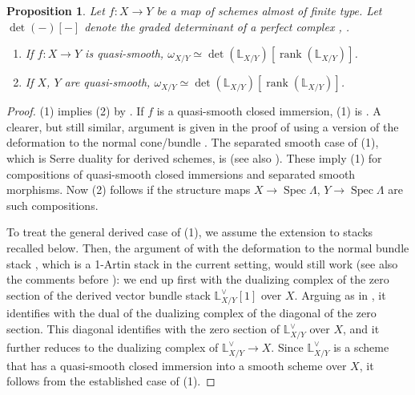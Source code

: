 \documentclass{amsart}
\newtheorem{proposition}[theorem]{Proposition}
\theoremstyle{definition}
\theoremstyle{remark}
\numberwithin{equation}{section}
\DeclareMathOperator{\Spec}{Spec}
\DeclareMathOperator{\rank}{rank}
\newcommand{\bb}{\mathbb}
\begin{document}
\begin{proposition}\label{prop: QuasismoothDualizingScheme}
Let $f\colon X\to Y$ be a map of schemes almost of finite type. Let $\det(-)[-]$ denote the graded determinant of a perfect complex \cite{Heleodoro}, \cite[Appendix B]{HalpernLeistner}.  
\begin{enumerate}
    \item If $f\colon X\to Y$ is quasi-smooth, $\omega_{X/Y}\simeq \det (\bb L_{X/Y})[\rank(\bb L_{X/Y})]$. 
    \item If $X$, $Y$ are quasi-smooth, $\omega_{X/Y} \simeq \det (\bb L_{X/Y})[\rank(\bb L_{X/Y})]$.  
\end{enumerate}
\end{proposition}

\begin{proof}
(1) implies (2) by \cite[(46), (48)]{HalpernLeistner}. If $f$ is a quasi-smooth closed immersion, (1) is \cite[Corollary 9.7.3.2]{GRII}. A clearer, but still similar, argument is given in the proof of \cite[Lemma 2.4.5]{HalpernLeistner} using a version of the deformation to the normal cone/bundle \cite{KhanRydh}. The separated smooth case of (1), which is Serre duality for derived schemes, is \cite[Proposition 9.7.3.4]{GRII} (see also \cite[Lecture VIII, Option 1]{ScholzeSixFunctor}). These imply (1) for compositions of quasi-smooth closed immersions and separated smooth morphisms. Now (2) follows if the structure maps $X\to \Spec \Lambda$, $Y\to \Spec \Lambda$ are such compositions.

To treat the general derived case of (1), we assume the extension to stacks recalled below. Then, the argument of \cite[Lemma 2.4.5]{HalpernLeistner} with the deformation to the normal bundle stack \cite[Theorem A]{HekkingKhanRydh}, which is a 1-Artin stack in the current setting, would still work (see also the comments before \cite[Proposition 3.1.5]{HalpernLeistner}): we end up first with the dualizing complex of the zero section of the derived vector bundle stack $\bb L_{X/Y}^{\vee}[1]$ over $X$. Arguing as in \cite[Proposition 8.14]{ScholzeSixFunctor}, it identifies with the dual of the dualizing complex of the diagonal of the zero section. This diagonal identifies with the zero section of $\bb L_{X/Y}^{\vee}$ over $X$, and it further reduces to the dualizing complex of $\bb L_{X/Y}^{\vee}\to X$. Since $\bb L_{X/Y}^{\vee}$ is a scheme that has a quasi-smooth closed immersion into a smooth scheme over $X$, it follows from the established case of (1). 
\end{proof}
\end{document}
